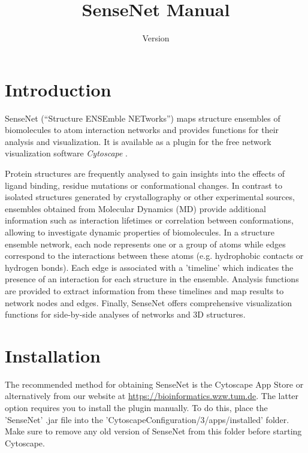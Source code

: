 

\title{SenseNet Manual}
\date{Version }
\maketitle

\clearpage

\tableofcontents
\clearpage

\section{Introduction}
SenseNet (``Structure ENSEmble NETworks'') maps structure ensembles of biomolecules to atom interaction networks and provides functions for their analysis and visualization. It is available as a plugin for the free network visualization software \textit{Cytoscape} \cite{Cytoscape}. 

Protein structures are frequently analysed to gain insights into the effects of ligand binding, residue mutations or conformational changes. In contrast to isolated structures generated by crystallography or other experimental sources, ensembles obtained from Molecular Dynamics (MD) provide additional information such as interaction lifetimes or correlation between conformations, allowing to investigate dynamic properties of biomolecules. In a structure ensemble network, each node represents one or a group of atoms while edges correspond to the interactions between these atoms (e.g. hydrophobic contacts or hydrogen bonds). Each edge is associated with a 'timeline' which indicates the presence of an interaction for each structure in the ensemble. Analysis functions are provided to extract information from these timelines and map results to network nodes and edges. Finally, SenseNet offers comprehensive visualization functions for side-by-side analyses of networks and 3D structures. 

\section{Installation}
\label{sec:installation}

The recommended method for obtaining SenseNet is the Cytoscape App Store or alternatively from our website at \url{https://bioinformatics.wzw.tum.de}. The latter option requires you to install the plugin manually. To do this, place the 'SenseNet' .jar file into the 'CytoscapeConfiguration/3/apps/installed' folder. Make sure to remove any old version of SenseNet from this folder before starting Cytoscape.


